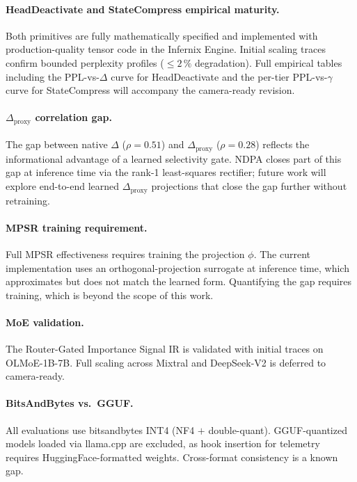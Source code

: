 \documentclass[11pt]{article}
\newcommand{\dsig}{\Delta}
\newcommand{\ir}{\mathrm{IR}}
\newcommand{\proxydsig}{\ensuremath{\dsig_{\mathrm{proxy}}}}
\begin{document}
\paragraph{HeadDeactivate and StateCompress empirical maturity.}
Both primitives are fully mathematically specified and implemented with
production-quality tensor code in the Infernix Engine. Initial scaling
traces confirm bounded perplexity profiles ($\le 2\,\%$ degradation). Full
empirical tables including the PPL-vs-$\dsig$ curve for HeadDeactivate and
the per-tier PPL-vs-$\gamma$ curve for StateCompress will accompany the
camera-ready revision.

\paragraph{$\proxydsig$ correlation gap.}
The gap between native $\dsig$ ($\rho{=}0.51$) and $\proxydsig$
($\rho{=}0.28$) reflects the informational advantage of a learned selectivity
gate. NDPA closes part of this gap at inference time via the rank-1
least-squares rectifier; future work will explore end-to-end learned
$\proxydsig$ projections that close the gap further without retraining.

\paragraph{MPSR training requirement.}
Full MPSR effectiveness requires training the projection $\phi$. The current
implementation uses an orthogonal-projection surrogate at inference time,
which approximates but does not match the learned form. Quantifying the gap
requires training, which is beyond the scope of this work.

\paragraph{MoE validation.}
The Router-Gated Importance Signal $\ir$ is validated with initial traces
on OLMoE-1B-7B. Full scaling across Mixtral and DeepSeek-V2 is deferred to
camera-ready.

\paragraph{BitsAndBytes vs.\ GGUF.}
All evaluations use bitsandbytes INT4 (NF4 $+$ double-quant). GGUF-quantized
models loaded via llama.cpp are excluded, as hook insertion for telemetry
requires HuggingFace-formatted weights. Cross-format consistency is a known
gap.
\end{document}
